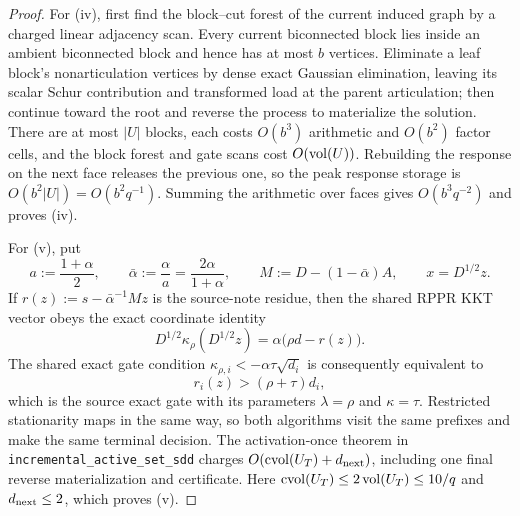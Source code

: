 \begin{proof}
For (iv), first find the block--cut forest of the current induced graph by a
charged linear adjacency scan.  Every current biconnected block lies inside
an ambient biconnected block and hence has at most $b$ vertices.  Eliminate a
leaf block's nonarticulation vertices by dense exact Gaussian elimination,
leaving its scalar Schur contribution and transformed load at the parent
articulation; then continue toward the root and reverse the process to
materialize the solution.  There are at most $|U|$ blocks, each costs
$O(b^3)$ arithmetic and $O(b^2)$ factor cells, and the block forest and gate
scans cost $O(\operatorname{vol}(U))$.  Rebuilding the response on the next face releases
the previous one, so the peak response storage is
$O(b^2|U|)=O(b^2q^{-1})$.  Summing the arithmetic over faces gives
$O(b^3q^{-2})$ and proves (iv).

For (v), put
\begin{equation}
 a:=\frac{1+\alpha}{2},
 \qquad
 \bar\alpha:=\frac{\alpha}{a}=\frac{2\alpha}{1+\alpha},
 \qquad
 M:=D-(1-\bar\alpha)A,
 \qquad x=D^{1/2}z.
 \label{eq:structured-response-source-map}
\end{equation}
If $r(z):=s-\bar\alpha^{-1}Mz$ is the source-note residue, then the shared
RPPR KKT vector obeys the exact coordinate identity
\begin{equation}
 D^{1/2}\kappa_\rho(D^{1/2}z)
 =\alpha\bigl(\rho d-r(z)\bigr).
 \label{eq:structured-response-kkt-map}
\end{equation}
The shared exact gate condition
$\kappa_{\rho,i}< -\alpha\tau\sqrt{d_i}$ is consequently equivalent to
\begin{equation}
 r_i(z)>(\rho+\tau)d_i,
 \label{eq:structured-response-gate-map}
\end{equation}
which is the source exact gate with its parameters
$\lambda=\rho$ and $\kappa=\tau$.  Restricted stationarity maps in the same
way, so both algorithms visit the same prefixes and make the same terminal
decision.  The activation-once theorem in
\texttt{incremental\_active\_set\_sdd} charges
$O(\operatorname{cvol}(U_T)+d_{\rm next})$, including one final reverse
materialization and certificate.  Here
$\operatorname{cvol}(U_T)\leq2\operatorname{vol}(U_T)\leq10/q$ and
$d_{\rm next}\leq2$, which proves (v).
\end{proof}

